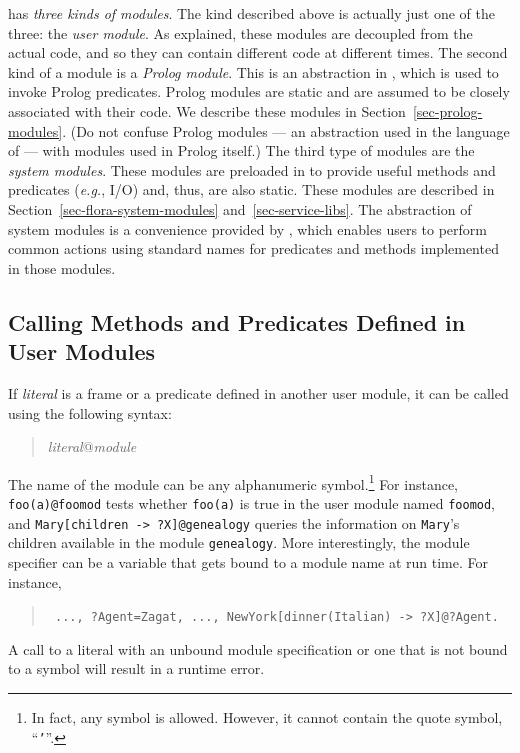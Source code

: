 \documentclass[11pt]{article}
\newcommand{\ERGO}{\mbox{\smaller{\ensuremath{\cal{E}}\smaller{{\sc{RGO}}}}}\xspace}
\newcommand{\FLSYSTEM}{\ERGO}
\newcommand{\mvd}{{\mbox{\tt \,->\,}}}  %
\begin{document}
\FLSYSTEM has \emph{three kinds of modules}.
The kind described above is actually just one of the three:
the \emph{user module}. As explained, these modules are decoupled from the
actual code, and so they can contain different code at different times.
The second kind of a module
is a \emph{Prolog module}. This is an abstraction in \FLSYSTEM,
which is used to invoke Prolog predicates. Prolog modules are static and are
assumed to be closely associated with their code. We describe these modules
in Section~\ref{sec-prolog-modules}. (Do not confuse \FLSYSTEM Prolog modules
--- an abstraction used in the language of \FLSYSTEM --- with modules used
in Prolog itself.)  The third type of modules are the
\emph{\FLSYSTEM system modules}. These modules are preloaded in \FLSYSTEM
to provide useful methods and predicates ({\it e.g.}, I/O) and,
thus, are also static. These modules are described in
Section~\ref{sec-flora-system-modules} and~\ref{sec-service-libs}. The
abstraction of system modules is a convenience provided by \FLSYSTEM, which
enables users to perform common actions using standard names for
predicates and methods implemented in those modules.


\subsection{Calling Methods and Predicates Defined in User Modules}


%
If \emph{literal} is a frame or a predicate defined in another
user module, it can be called using the following syntax:
\begin{quote}
\emph{literal}@\emph{module} 
\end{quote}
The name of the module can be any alphanumeric symbol.\footnote{
  In fact, any symbol is allowed. However, it cannot contain the quote
  symbol, ``{\tt '}''.
  }
For instance, \verb|foo(a)@foomod| tests whether {\tt foo(a)} is true in
the user module named {\tt foomod}, and {\tt Mary[children\mvd ?X]@genealogy}
queries the information on {\tt Mary}'s children available in the module
{\tt genealogy}. More interestingly, the module specifier can be a variable
that gets bound to a module name at run time. For instance, 
\begin{quote}
 {\tt
   ..., ?Agent=Zagat, ..., NewYork[dinner(Italian)\mvd ?X]@?Agent.
   }
\end{quote}
A call to a literal with an unbound module specification or one that is not
bound to a symbol will result in a runtime error.
\end{document}
